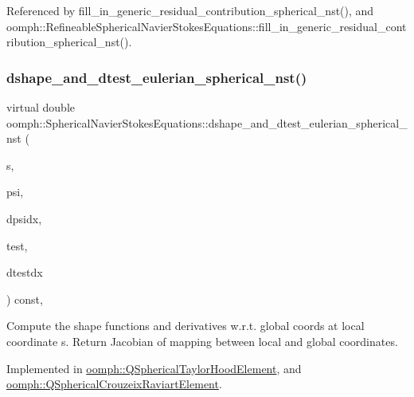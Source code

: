 Referenced by fill\+\_\+in\+\_\+generic\+\_\+residual\+\_\+contribution\+\_\+spherical\+\_\+nst(), and oomph\+::\+Refineable\+Spherical\+Navier\+Stokes\+Equations\+::fill\+\_\+in\+\_\+generic\+\_\+residual\+\_\+contribution\+\_\+spherical\+\_\+nst().

\mbox{\label{classoomph_1_1SphericalNavierStokesEquations_a3b9e9cf2d59dffcf278b4c9f73be6d62}} 
\subsubsection{\texorpdfstring{dshape\+\_\+and\+\_\+dtest\+\_\+eulerian\+\_\+spherical\+\_\+nst()}{dshape\_and\_dtest\_eulerian\_spherical\_nst()}}
{\footnotesize\ttfamily virtual double oomph\+::\+Spherical\+Navier\+Stokes\+Equations\+::dshape\+\_\+and\+\_\+dtest\+\_\+eulerian\+\_\+spherical\+\_\+nst (\begin{DoxyParamCaption}\item[{const \hyperlink{classoomph_1_1Vector}{Vector}$<$ double $>$ \&}]{s,  }\item[{\hyperlink{classoomph_1_1Shape}{Shape} \&}]{psi,  }\item[{\hyperlink{classoomph_1_1DShape}{D\+Shape} \&}]{dpsidx,  }\item[{\hyperlink{classoomph_1_1Shape}{Shape} \&}]{test,  }\item[{\hyperlink{classoomph_1_1DShape}{D\+Shape} \&}]{dtestdx }\end{DoxyParamCaption}) const\hspace{0.3cm}{\ttfamily [protected]}, {}}



Compute the shape functions and derivatives w.\+r.\+t. global coords at local coordinate s. Return Jacobian of mapping between local and global coordinates. 



Implemented in \hyperlink{classoomph_1_1QSphericalTaylorHoodElement_ad6ac4efe30e2d18801f17f000db47a25}{oomph\+::\+Q\+Spherical\+Taylor\+Hood\+Element}, and \hyperlink{classoomph_1_1QSphericalCrouzeixRaviartElement_afee40460a2cfad52d95fc9681c8d6a12}{oomph\+::\+Q\+Spherical\+Crouzeix\+Raviart\+Element}.

